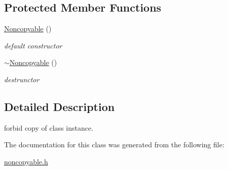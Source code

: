 \subsection*{Protected Member Functions}
\begin{DoxyCompactItemize}
\item 
\hypertarget{classhryky_1_1_noncopyable_a4be18fc3db624b52a1326d4a29058feb}{\hyperlink{classhryky_1_1_noncopyable_a4be18fc3db624b52a1326d4a29058feb}{Noncopyable} ()}\label{classhryky_1_1_noncopyable_a4be18fc3db624b52a1326d4a29058feb}

\begin{DoxyCompactList}\small\item\em default constructor \end{DoxyCompactList}\item 
\hypertarget{classhryky_1_1_noncopyable_aa692057b9d2b49976ae79e35d33009a4}{\hyperlink{classhryky_1_1_noncopyable_aa692057b9d2b49976ae79e35d33009a4}{$\sim$\-Noncopyable} ()}\label{classhryky_1_1_noncopyable_aa692057b9d2b49976ae79e35d33009a4}

\begin{DoxyCompactList}\small\item\em destrunctor \end{DoxyCompactList}\end{DoxyCompactItemize}


\subsection{Detailed Description}
forbid copy of class instance. 

The documentation for this class was generated from the following file\-:\begin{DoxyCompactItemize}
\item 
\hyperlink{noncopyable_8h}{noncopyable.\-h}\end{DoxyCompactItemize}
